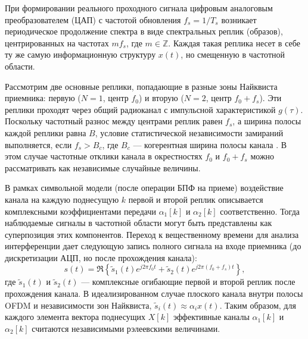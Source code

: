 \documentclass[a4paper,12pt]{article}
\numberwithin{equation}{section}
\begin{document}
При формировании реального проходного сигнала цифровым аналоговым преобразователем (ЦАП) с частотой обновления $f_s = 1/T_s$ возникает периодическое продолжение спектра в виде спектральных реплик (образов), центрированных на частотах $m f_s$, где $m \in \mathbb{Z}$. Каждая такая реплика несет в себе ту же самую информационную структуру $x(t)$, но смещенную в частотной области.

Рассмотрим две основные реплики, попадающие в разные зоны Найквиста приемника: первую ($N=1$, центр $f_0$) и вторую ($N=2$, центр $f_0 + f_s$). Эти реплики проходят через общий радиоканал с импульсной характеристикой $g(\tau)$. Поскольку частотный разнос между центрами реплик равен $f_s$, а ширина полосы каждой реплики равна $B$, условие статистической независимости замираний выполняется, если $f_s > B_c$, где $B_c$ — когерентная ширина полосы канала \cite{goldsmith}. В этом случае частотные отклики канала в окрестностях $f_0$ и $f_0+f_s$ можно рассматривать как независимые случайные величины.

В рамках символьной модели (после операции БПФ на приеме) воздействие канала на каждую поднесущую $k$ первой и второй реплик описывается комплексными коэффициентами передачи $\alpha_1[k]$ и $\alpha_2[k]$ соответственно. Тогда наблюдаемые сигналы в частотной области могут быть представлены как суперпозиция этих компонентов. Переход к вещественному времени для анализа интерференции дает следующую запись полного сигнала на входе приемника (до дискретизации АЦП, но после прохождения канала):
\begin{equation}
s(t) = \Re \left\{ \tilde{s}_1(t) e^{j 2 \pi f_0 t} + \tilde{s}_2(t) e^{j 2 \pi (f_0 + f_s) t} \right\},
\label{eq:real_signal}
\end{equation}
где $\tilde{s}_1(t)$ и $\tilde{s}_2(t)$ — комплексные огибающие первой и второй реплик после прохождения канала. В идеализированном случае плоского канала внутри полосы OFDM и независимости зон Найквиста, $\tilde{s}_i(t) \approx \alpha_i x(t)$. Таким образом, для каждого элемента вектора поднесущих $X[k]$ эффективные каналы $\alpha_1[k]$ и $\alpha_2[k]$ считаются независимыми рэлеевскими величинами.
\end{document}
